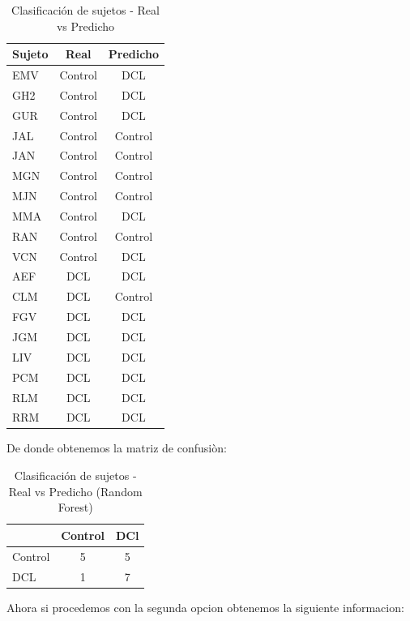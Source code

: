 \begin{table}[H]
\centering
\caption{Clasificación de sujetos - Real vs Predicho}
\label{tab:clasificacion}
\begin{tabular}{lcc}
\toprule
\textbf{Sujeto} & \textbf{Real} & \textbf{Predicho} \\
\midrule
EMV  & Control & DCL \\
GH2  & Control & DCL \\
GUR  & Control & DCL \\
JAL  & Control & Control \\
JAN  & Control & Control \\
MGN  & Control & Control \\
MJN  & Control & Control \\
MMA  & Control & DCL \\
RAN  & Control & Control \\
VCN  & Control & DCL \\
AEF  & DCL     & DCL \\
CLM  & DCL     & Control \\
FGV  & DCL     & DCL \\
JGM  & DCL     & DCL \\
LIV  & DCL     & DCL \\
PCM  & DCL     & DCL \\
RLM  & DCL     & DCL \\
RRM  & DCL     & DCL \\
\bottomrule
\end{tabular}
\end{table}

De donde obtenemos la matriz de confusiòn:

\begin{table}[H]
\centering
\caption{Clasificación de sujetos - Real vs Predicho (Random Forest)}
\label{tab:clasificacion1_rf}
\begin{tabular}{lcc}
\toprule
\textbf{} & \textbf{Control} & \textbf{DCl} \\
\midrule
Control & 5 & 5 \\
DCL  & 1 & 7 \\
\bottomrule
\end{tabular}
\end{table}

Ahora si procedemos con la segunda opcion obtenemos la siguiente informacion:

